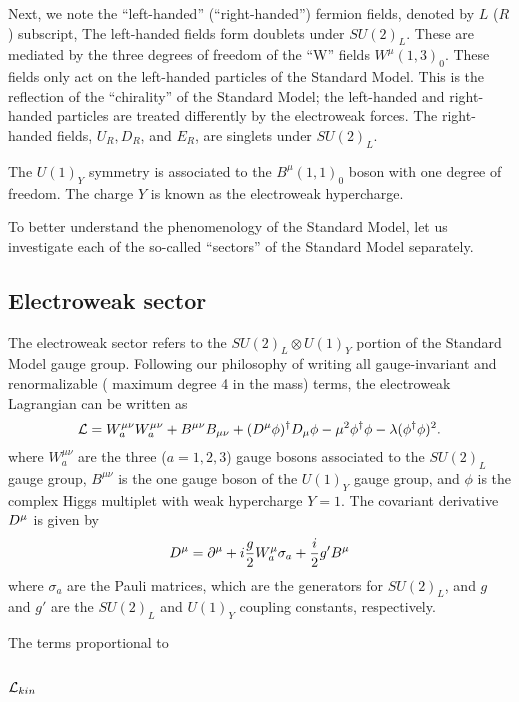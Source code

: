 Next, we note the ``left-handed'' (``right-handed'') fermion fields, denoted by $L$ ($R$) subscript,
The left-handed fields form doublets under $SU(2)_L$.
These are mediated by the three degrees of freedom of the  ``W'' fields $W^\mu(1,3)_0$.
These fields only act on the left-handed particles of the Standard Model.
This is the reflection of the ``chirality'' of the Standard Model; the left-handed and right-handed particles are treated differently by the electroweak forces.
The right-handed fields, $U_R, D_R$, and $E_R$, are singlets under $SU(2)_L$.

The $U(1)_Y$ symmetry is associated to the $B^\mu(1,1)_0$ boson with one degree of freedom.
The charge $Y$ is known as the electroweak hypercharge.

To better understand the phenomenology of the Standard Model, let us investigate each of the so-called ``sectors'' of the Standard Model separately.

\subsection{Electroweak sector}

The electroweak sector refers to the $SU(2)_L \otimes U(1)_Y$ portion of the Standard Model gauge group.
Following our philosophy of writing all gauge-invariant and renormalizable ( maximum degree 4 in the mass) terms, the electroweak Lagrangian can be written as
\begin{equation}
\mathcal{L} =  W^{\mu\nu}_a W^{\mu\nu}_a + B^{\mu\nu} B_{\mu\nu} + (D^\mu \phi)^\dagger D_\mu \phi -  \mu^2 \phi^\dagger \phi - \lambda (\phi^\dagger \phi)^2.
\end{equation}
where $W^{\mu\nu}_a$ are the three ($a=1,2,3$) gauge bosons associated to the $SU(2)_L$ gauge group, $B^{\mu\nu}$ is the one gauge boson of the $U(1)_Y$ gauge group, and $\phi$ is the complex Higgs multiplet with weak hypercharge $Y = 1$.
The covariant derivative $D^\mu$ is given by
\begin{equation}
D^\mu = \partial^\mu  + i \frac{g}{2} W^\mu_a \sigma_a + \frac{i}{2} g' B^\mu
\end{equation}
where $\sigma_a$ are the Pauli matrices, which are the generators for $SU(2)_L$, and $g$ and $g'$ are the $SU(2)_L$ and $U(1)_Y$ coupling constants, respectively.

The terms proportional to

\subsection{$\mathcal{L}_{kin}$}

